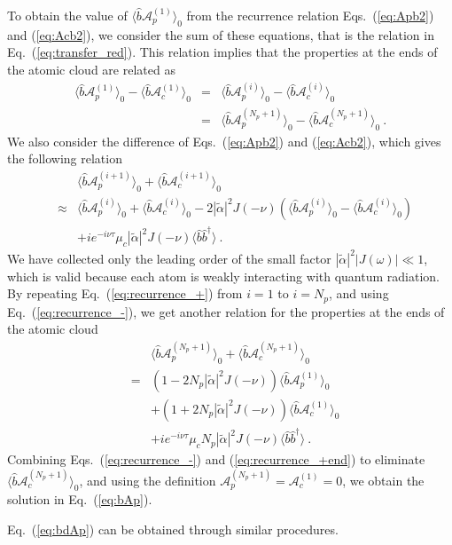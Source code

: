 \documentclass[aps, pra, reprint, amsmath, amssymb, groupedaddress, acknowledgments]{revtex4-1}
\begin{document}
To obtain the value of $\langle \hat{b}\mathcal{A}_p^{(1)} \rangle_0$ from the recurrence relation Eqs.~(\ref{eq:Apb2}) and (\ref{eq:Acb2}), we consider the sum of these equations, that is the relation in Eq.~(\ref{eq:transfer_red}).  This relation implies that the properties at the ends of the atomic cloud are related as
\begin{eqnarray}\label{eq:recurrence_-}
\langle \hat{b} \mathcal{A}_p^{(1)} \rangle_0 - \langle \hat{b} \mathcal{A}_c^{(1)} \rangle_0 &=&\langle \hat{b} \mathcal{A}_p^{(i)} \rangle_0 - \langle \hat{b} \mathcal{A}_c^{(i)} \rangle_0 \nonumber \\
&=&\langle \hat{b} \mathcal{A}_p^{(N_p+1)} \rangle_0 - \langle \hat{b} \mathcal{A}_c^{(N_p+1)} \rangle_0 ~.
\end{eqnarray}
We also consider the difference of Eqs.~(\ref{eq:Apb2}) and (\ref{eq:Acb2}), which gives the following relation
\begin{eqnarray}\label{eq:recurrence_+}
&&\langle \hat{b} \mathcal{A}_p^{(i+1)} \rangle_0 + \langle \hat{b} \mathcal{A}_c^{(i+1)} \rangle_0 \nonumber \\
&\approx &\langle \hat{b} \mathcal{A}_p^{(i)} \rangle_0 + \langle \hat{b} \mathcal{A}_c^{(i)} \rangle_0   - 2 |\tilde{\alpha}|^2 J(-\nu)(\langle \hat{b} \mathcal{A}_p^{(i)} \rangle_0 - \langle \hat{b} \mathcal{A}_c^{(i)} \rangle_0) \nonumber \\
&&+ i e^{-i\nu \tau} \mu_c |\tilde{\alpha}|^2 J(-\nu) \langle \hat{b}\hat{b}^\dag\rangle~.~~
\end{eqnarray}
We have collected only the leading order of the small factor $|\tilde{\alpha}|^2 |J(\omega)| \ll 1$, which is valid because each atom is weakly interacting with quantum radiation.  By repeating Eq.~(\ref{eq:recurrence_+}) from $i=1$ to $i=N_p$, and using Eq.~(\ref{eq:recurrence_-}), we get another relation for the properties at the ends of the atomic cloud
\begin{eqnarray}\label{eq:recurrence_+end}
&&\langle \hat{b} \mathcal{A}_p^{(N_p+1)} \rangle_0 + \langle \hat{b} \mathcal{A}_c^{(N_p+1)} \rangle_0 \nonumber \\
&=& (1- 2 N_p |\tilde{\alpha}|^2 J(-\nu))\langle \hat{b} \mathcal{A}_p^{(1)} \rangle_0 \nonumber\\
&&+ (1+2 N_p |\tilde{\alpha}|^2 J(-\nu)) \langle \hat{b} \mathcal{A}_c^{(1)} \rangle_0   \nonumber \\
&&+ i e^{-i\nu \tau} \mu_c N_p |\tilde{\alpha}|^2 J(-\nu) \langle \hat{b}\hat{b}^\dag\rangle~.
\end{eqnarray}
Combining Eqs.~(\ref{eq:recurrence_-}) and (\ref{eq:recurrence_+end}) to eliminate $\langle \hat{b} \mathcal{A}_c^{(N_p+1)} \rangle_0$, and using the definition $\mathcal{A}_p^{(N_p+1)}=\mathcal{A}_c^{(1)}=0$, we obtain the solution in Eq.~(\ref{eq:bAp}).

Eq.~(\ref{eq:bdAp}) can be obtained through similar procedures.




\pagestyle{plain}

\end{document}
